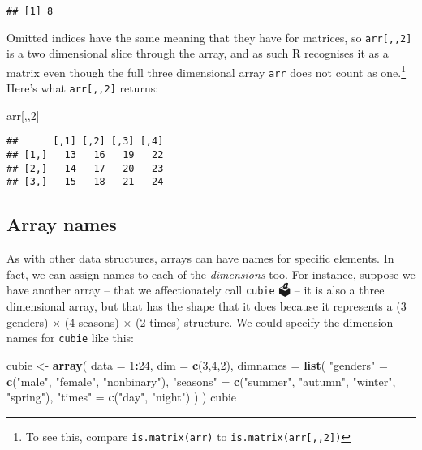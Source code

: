\documentclass[]{book}
\newenvironment{Shaded}{\begin{snugshade}}{\end{snugshade}}
\newcommand{\DataTypeTok}[1]{\textcolor[rgb]{0.13,0.29,0.53}{#1}}
\newcommand{\DecValTok}[1]{\textcolor[rgb]{0.00,0.00,0.81}{#1}}
\newcommand{\KeywordTok}[1]{\textcolor[rgb]{0.13,0.29,0.53}{\textbf{#1}}}
\newcommand{\NormalTok}[1]{#1}
\newcommand{\OperatorTok}[1]{\textcolor[rgb]{0.81,0.36,0.00}{\textbf{#1}}}
\newcommand{\StringTok}[1]{\textcolor[rgb]{0.31,0.60,0.02}{#1}}
\let\rmarkdownfootnote\footnote%
\def\footnote{\protect\rmarkdownfootnote}
\begin{document}
\begin{verbatim}
## [1] 8
\end{verbatim}

Omitted indices have the same meaning that they have for matrices, so \texttt{arr{[},,2{]}} is a two dimensional slice through the array, and as such R recognises it as a matrix even though the full three dimensional array \texttt{arr} does not count as one.\footnote{To see this, compare \texttt{is.matrix(arr)} to \texttt{is.matrix(arr{[},,2{]})}} Here's what \texttt{arr{[},,2{]}} returns:

\begin{Shaded}
\begin{Highlighting}[]
\NormalTok{arr[,,}\DecValTok{2}\NormalTok{]}
\end{Highlighting}
\end{Shaded}

\begin{verbatim}
##      [,1] [,2] [,3] [,4]
## [1,]   13   16   19   22
## [2,]   14   17   20   23
## [3,]   15   18   21   24
\end{verbatim}

\hypertarget{array-names}{%
\subsection{Array names}\label{array-names}}

As with other data structures, arrays can have names for specific elements. In fact, we can assign names to each of the \emph{dimensions} too. For instance, suppose we have another array -- that we affectionately call \texttt{cubie} 🗳 -- it is also a three dimensional array, but that has the shape that it does because it represents a (3 genders) \(\times\) (4 seasons) \(\times\) (2 times) structure. We could specify the dimension names for \texttt{cubie} like this:

\begin{Shaded}
\begin{Highlighting}[]
\NormalTok{cubie <-}\StringTok{ }\KeywordTok{array}\NormalTok{(}
  \DataTypeTok{data =} \DecValTok{1}\OperatorTok{:}\DecValTok{24}\NormalTok{, }
  \DataTypeTok{dim =} \KeywordTok{c}\NormalTok{(}\DecValTok{3}\NormalTok{,}\DecValTok{4}\NormalTok{,}\DecValTok{2}\NormalTok{), }
  \DataTypeTok{dimnames =} \KeywordTok{list}\NormalTok{(}
    \StringTok{"genders"}\NormalTok{ =}\StringTok{ }\KeywordTok{c}\NormalTok{(}\StringTok{"male"}\NormalTok{, }\StringTok{"female"}\NormalTok{, }\StringTok{"nonbinary"}\NormalTok{),}
    \StringTok{"seasons"}\NormalTok{ =}\StringTok{ }\KeywordTok{c}\NormalTok{(}\StringTok{"summer"}\NormalTok{, }\StringTok{"autumn"}\NormalTok{, }\StringTok{"winter"}\NormalTok{, }\StringTok{"spring"}\NormalTok{),}
    \StringTok{"times"}\NormalTok{ =}\StringTok{ }\KeywordTok{c}\NormalTok{(}\StringTok{"day"}\NormalTok{, }\StringTok{"night"}\NormalTok{)}
\NormalTok{    )}
\NormalTok{  )}
\NormalTok{cubie}
\end{Highlighting}
\end{Shaded}
\end{document}
